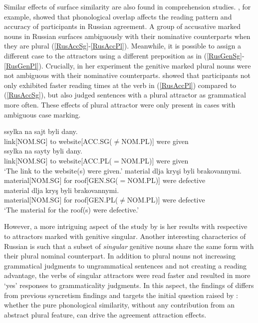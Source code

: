 \documentclass[
  authoryear,
  3p]{elsarticle}
\begin{document}
Similar effects of surface similarity are also found in comprehension
studies. \citet{Slioussar2018}, for example, showed that phonological
overlap affects the reading pattern and accuracy of participants in
Russian agreement. A group of accusative marked nouns in Russian
surfaces ambiguously with their nominative counterparts when they are
plural (\ref{RusAccSg}-\ref{RusAccPl}). Meanwhile, it is possible to
assign a different case to the attractors using a different preposition
as in (\ref{RusGenSg}-\ref{RusGenPl}). Crucially, in her experiment the
genitive marked plural nouns were not ambiguous with their nominative
counterparts. \citet{Slioussar2018} showed that participants not only
exhibited faster reading times at the verb in (\ref{RusAccPl}) compared
to (\ref{RusAccSg}), but also judged sentences with a plural attractor
as grammatical more often. These effects of plural attractor were only
present in cases with ambiguous case marking.

\begin{exe}
\ex
\begin{xlist}
\ex \label{RusAccSg}
\gll ssylka na sajt byli dany.\\
link[NOM.SG] to {website[ACC.SG($\neq$NOM.PL)]} were given\\
\ex \label{RusAccPl}
\gll ssylka na sayty byli dany.\\
link[NOM.SG] to {website[ACC.PL($=$NOM.PL)]} were given\\
\glt `The link to the website(s) were given.'
\ex \label{RusGenSg}
\gll material dlja kry\c{s}i byli brakovannymi.\\
material[NOM.SG] for {roof[GEN.SG($=$NOM.PL)]} were defective\\
\ex \label{RusGenPl}
\gll material dlja kry\c{s} byli brakovannymi.\\
material[NOM.SG] for {roof[GEN.PL($\neq$NOM.PL)]} were defective\\
\glt `The material for the roof(s) were defective.'
\end{xlist}
\end{exe}

However, a more intriguing aspect of the study by \citet{Slioussar2018}
is her results with respective to attractors marked with genitive
singular. Another interesting characterics of Russian is such that a
subset of \emph{singular} genitive nouns share the same form with their
plural nominal counterpart. In addition to plural nouns not increasing
grammatical judgments to ungrammatical sentences and not creating a
reading advantage, the verbs of singular attractors were read faster and
resulted in more `yes' responses to grammaticality judgments. In this
aspect, the findings of \citet{Slioussar2018} differs from previous
syncretism findings and targets the initial question raised by
\citet{BockEberhard1993}: whether the pure phonological similarity,
without any contribution from an abstract plural feature, can drive the
agreement attraction effects.
\end{document}
